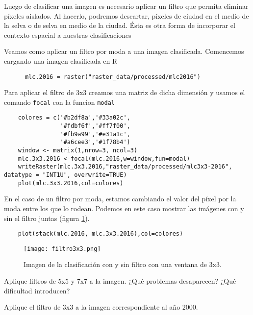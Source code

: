 Luego de clasificar una imagen es necesario aplicar un filtro que permita eliminar p\'ixeles aislados. Al hacerlo, podremos descartar, p\'ixeles de ciudad en el medio de la selva o de selva en medio de la ciudad. \'Esta es otra forma de incorporar el contexto espacial a nuestras clasificaciones
\begin{exa}
  Veamos como aplicar un filtro por moda a una imagen clasificada. Comencemos cargando una imagen clasificada en R

  \begin{lstlisting}
      mlc.2016 = raster("raster_data/processed/mlc2016")
  \end{lstlisting}

  Para aplicar el filtro de 3x3 creamos una matriz de dicha dimensi\'on y usamos el comando \texttt{focal} con la funcion \texttt{modal}

  \begin{lstlisting}
    colores = c('#b2df8a','#33a02c',
                '#fdbf6f','#ff7f00',
                '#fb9a99','#e31a1c',
                '#a6cee3','#1f78b4')
    window <- matrix(1,nrow=3, ncol=3)
    mlc.3x3.2016 <-focal(mlc.2016,w=window,fun=modal)
    writeRaster(mlc.3x3.2016,"raster_data/processed/mlc3x3-2016", datatype = "INT1U", overwrite=TRUE)
    plot(mlc.3x3.2016,col=colores)
  \end{lstlisting}

  En el caso de un filtro por moda, estamos cambiando el valor del p\'ixel por la moda entre los que lo rodean. Podemos en este caso mostrar las im\'agenes con y sin el filtro juntas (figura \ref{fig:3x3}).

  \begin{lstlisting}
    plot(stack(mlc.2016, mlc.3x3.2016),col=colores)
  \end{lstlisting}

  \begin{figure}[h!]
    \centering
    \texttt{[image: filtro3x3.png]}
    \caption{Imagen de la clasificaci\'on con y sin filtro con una ventana de 3x3.}
    \label{fig:3x3}
  \end{figure}
\end{exa}

\begin{act}
    Aplique filtros de 5x5 y 7x7 a la imagen. ¿Qu\'e problemas desaparecen? ¿Qu\'e dificultad introducen?
\end{act}

\begin{act}
    Aplique el filtro de 3x3 a la imagen correspondiente al año 2000.
\end{act}

